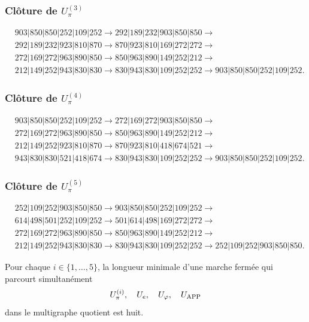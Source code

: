 \subsubsection{Clôture de \texorpdfstring{\(U_\pi^{(3)}\)}{U-pi 3}}
\begin{align*}
&903|850|850|252|109|252\to
292|189|232|903|850|850\to\\
&292|189|232|923|810|870\to
870|923|810|169|272|272\to\\
&272|169|272|963|890|850\to
850|963|890|149|252|212\to\\
&212|149|252|943|830|830\to
830|943|830|109|252|252\to
903|850|850|252|109|252.
\end{align*}

\subsubsection{Clôture de \texorpdfstring{\(U_\pi^{(4)}\)}{U-pi 4}}
\begin{align*}
&903|850|850|252|109|252\to
272|169|272|903|850|850\to\\
&272|169|272|963|890|850\to
850|963|890|149|252|212\to\\
&212|149|252|923|810|870\to
870|923|810|418|674|521\to\\
&943|830|830|521|418|674\to
830|943|830|109|252|252\to
903|850|850|252|109|252.
\end{align*}

\subsubsection{Clôture de \texorpdfstring{\(U_\pi^{(5)}\)}{U-pi 5}}
\begin{align*}
&252|109|252|903|850|850\to
903|850|850|252|109|252\to\\
&614|498|501|252|109|252\to
501|614|498|169|272|272\to\\
&272|169|272|963|890|850\to
850|963|890|149|252|212\to\\
&212|149|252|943|830|830\to
830|943|830|109|252|252\to
252|109|252|903|850|850.
\end{align*}

\begin{theorem}
\label{p12-83-c8-s1:thm:minimalidad-cierres-pi-autonoma}
Pour chaque \(i\in\{1,\ldots,5\}\), la longueur minimale d’une marche fermée
qui parcourt simultanément
\[
 U_\pi^{(i)},\quad U_e,\quad U_\varphi,\quad U_{\rm APP}
\]
dans le multigraphe quotient est huit.
\end{theorem}

